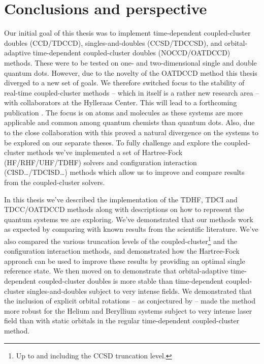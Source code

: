 \chapter{Conclusions and perspective}
    Our initial goal of this thesis was to implement time-dependent
    coupled-cluster doubles (CCD/TDCCD), singles-and-doubles (CCSD/TDCCSD), and
    orbital-adaptive time-dependent coupled-cluster doubles (NOCCD/OATDCCD)
    methods.
    These were to be tested on one- and two-dimensional single and double
    quantum dots.
    However, due to the novelty of the OATDCCD method this thesis diverged to a
    new set of goals.
    We therefore switched focus to the stability of real-time coupled-cluster
    methods -- which in itself is a rather new research area -- with
    collaborators at the Hylleraas Center.
    This will lead to a forthcoming publication \cite{oa-stability}.
    The focus is on atoms and molecules as these systems are more applicable and
    common among quantum chemists than quantum dots.
    Also, due to the close collaboration with \citeauthor{greg-winther} this
    proved a natural divergence on the systems to be explored on our separate
    theses.
    To fully challenge and explore the coupled-cluster methods we've implemented
    a set of Hartree-Fock (HF/RHF/UHF/TDHF) solvers and configuration
    interaction (CISD\dots/TDCISD\dots) methods which allow us to improve and
    compare results from the coupled-cluster solvers.

    In this thesis we've described the implementation of the TDHF, TDCI and
    TDCC/OATDCCD methods along with descriptions on how to represent the quantum
    systems we are exploring.
    We've demonstrated that our methods work as expected by comparing with known
    results from the scientific literature.
    We've also compared the various truncation levels of the
    coupled-cluster\footnote{%
        Up to and including the CCSD truncation level.
    }
    and the configuration interaction methods, and demonstrated how the
    Hartree-Fock approach can be used to improve these results by providing an
    optimal single reference state.
    We then moved on to demonstrate that orbital-adaptive time-dependent
    coupled-cluster doubles is more stable than time-dependent coupled-cluster
    singles-and-doubles subject to very intense fields.
    We demonstrated that the inclusion of explicit orbital rotations -- as
    conjectured by \citeauthor{pedersen2018symplectic}
    \cite{pedersen2018symplectic} -- made the method more robust for the Helium
    and Beryllium systems subject to very intense laser field than with static
    orbitals in the regular time-dependent coupled-cluster method.

